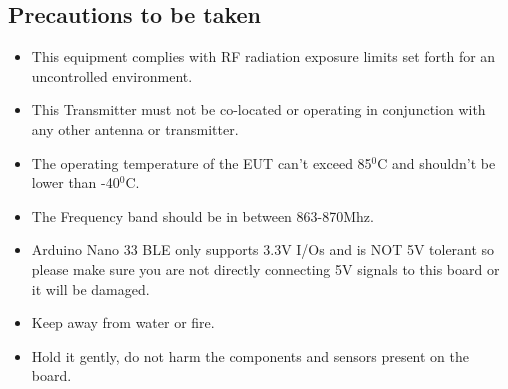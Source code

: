 
\subsection{Precautions to be taken}

\begin{itemize}
    
    \item This equipment complies with RF radiation exposure limits set forth for an uncontrolled environment.
    \item This Transmitter must not be co-located or operating in conjunction with any other antenna or transmitter.
    \item The operating temperature of the EUT can't exceed 85$^{0}$C and shouldn't be lower than -40$^{0}$C.
    \item The Frequency band should be in between 863-870Mhz.
    \item Arduino Nano 33 BLE only supports 3.3V I/Os and is NOT 5V tolerant so please make sure you are not directly connecting 5V signals to this board or it will be damaged.
    \item Keep away from water or fire.
    \item Hold it gently, do not harm the components and sensors present on the board.
    
\end{itemize}

